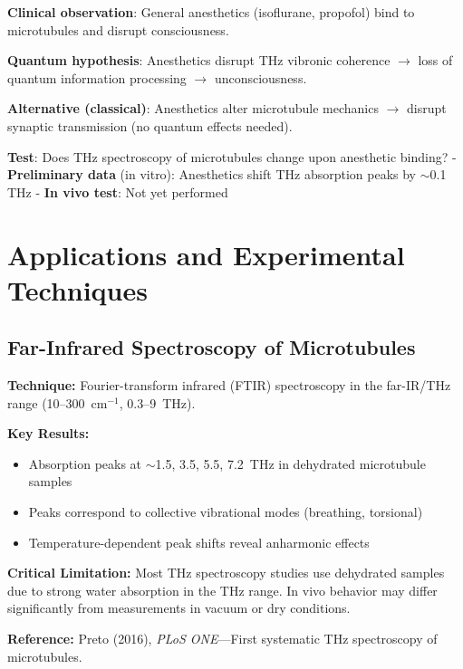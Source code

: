 \textbf{Clinical observation}: General anesthetics (isoflurane,
propofol) bind to microtubules and disrupt consciousness.

\textbf{Quantum hypothesis}: Anesthetics disrupt THz vibronic coherence $\rightarrow$ loss of quantum information processing $\rightarrow$ unconsciousness.

\textbf{Alternative (classical)}: Anesthetics alter microtubule mechanics $\rightarrow$ disrupt synaptic transmission (no quantum effects needed).

\textbf{Test}: Does THz spectroscopy of microtubules change upon
anesthetic binding? - \textbf{Preliminary data} (in vitro): Anesthetics
shift THz absorption peaks by $\sim$0.1 THz - \textbf{In vivo
test}: Not yet performed




\section{Applications and Experimental Techniques}
\label{sec:applications}

\subsection{Far-Infrared Spectroscopy of Microtubules}
\label{subsec:app-ftir}

\textbf{Technique:} Fourier-transform infrared (FTIR) spectroscopy in the far-IR/THz range (10--300~cm$^{-1}$, 0.3--9~THz).

\textbf{Key Results:}
\begin{itemize}
\item Absorption peaks at $\sim$1.5, 3.5, 5.5, 7.2~THz in dehydrated microtubule samples
\item Peaks correspond to collective vibrational modes (breathing, torsional)
\item Temperature-dependent peak shifts reveal anharmonic effects
\end{itemize}

\begin{warningbox}
\textbf{Critical Limitation:} Most THz spectroscopy studies use dehydrated samples due to strong water absorption in the THz range. In vivo behavior may differ significantly from measurements in vacuum or dry conditions.
\end{warningbox}

\textbf{Reference:} Preto (2016), \textit{PLoS ONE}---First systematic THz spectroscopy of microtubules.

